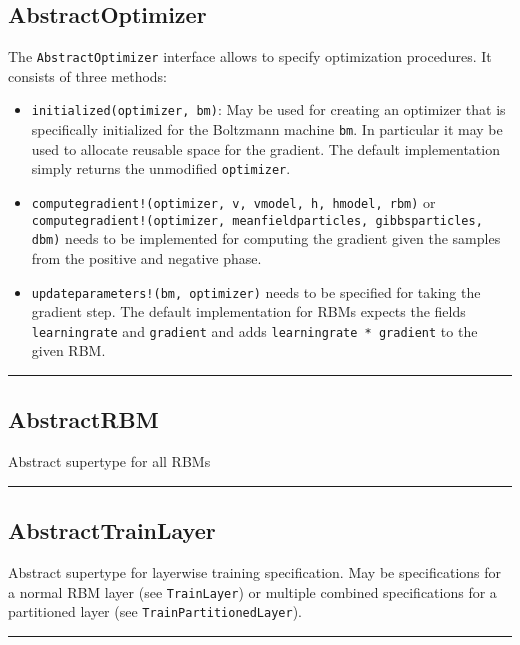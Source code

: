 \subsection*{AbstractOptimizer}  \label{bms_AbstractOptimizer}
The \texttt{AbstractOptimizer} interface allows to specify optimization procedures. It consists of three methods:

\begin{itemize}
\item \texttt{initialized(optimizer, bm)}: May be used for creating an optimizer that is  specifically initialized for the Boltzmann machine \texttt{bm}.  In particular it may be used to allocate reusable space for the gradient.  The default implementation simply returns the unmodified \texttt{optimizer}.


\item \texttt{computegradient!\allowbreak (optimizer, v, vmodel, h, hmodel, rbm)} or \texttt{computegradient!\allowbreak (optimizer, meanfieldparticles, gibbsparticles, dbm)}  needs to be implemented for computing the gradient given the samples  from the positive and negative phase.


\item \texttt{updateparameters!\allowbreak (bm, optimizer)} needs to be specified for taking the  gradient step. The default implementation for RBMs expects the fields  \texttt{learningrate} and \texttt{gradient} and adds \texttt{learningrate * gradient} to the  given RBM.

\end{itemize}
\noindent\rule{\textwidth}{1pt}
\subsection*{AbstractRBM}  \label{bms_AbstractRBM}
Abstract supertype for all RBMs 

\noindent\rule{\textwidth}{1pt}
\subsection*{AbstractTrainLayer}  \label{bms_AbstractTrainLayer}
Abstract supertype for layerwise training specification. May be specifications for a normal RBM layer (see \texttt{TrainLayer}) or multiple combined specifications for a partitioned layer (see \texttt{TrainPartitionedLayer}).

\noindent\rule{\textwidth}{1pt}
